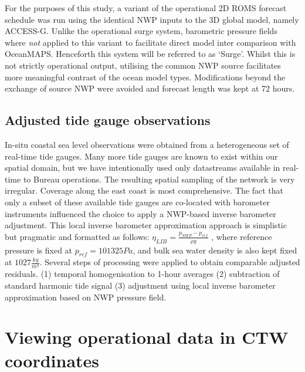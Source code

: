 For the purposes of this study, a variant of the operational 2D ROMS forecast schedule was run using the identical NWP inputs to the 3D global model, namely ACCESS-G.   
Unlike the operational surge system, barometric pressure fields where \emph{not} applied to this variant to facilitate direct model inter comparison with OceanMAPS.
Henceforth this system will be referred to as `Surge'.
Whilst this is not strictly operational output, utilising the common NWP source facilitates more meaningful contrast of the ocean model types. 
Modifications beyond the exchange of source NWP were avoided and forecast length was kept at 72 hours.


\subsection{Adjusted tide gauge observations}
In-situ coastal sea level observations were obtained from a heterogeneous set of real-time tide gauges. 
Many more tide gauges are known to exist within our spatial domain, but we have intentionally used only datastreams available in real-time to Bureau operations.
The resulting spatial sampling of the network is very irregular. 
Coverage along the east coast is most comprehensive.   
The fact that only a subset of these available tide gauges are co-located with barometer instruments influenced the choice to apply a NWP-based inverse barometer adjustment.
This local inverse barometer approximation approach is simplistic \citep{Mathers:2004bk} but pragmatic and formatted as follows:
$ \eta_{LIB} = \frac{ p_{NWP} - p_{ref} }{ \rho g } $
, where reference pressure is fixed at $p_{ref}=101325Pa$, and bulk sea water density is also kept fixed at $1027\frac{kg}{m^3}$. 
Several steps of processing were applied to obtain comparable adjusted residuals.
(1) temporal homogenisation to 1-hour averages (2) subtraction of standard harmonic tide signal (3) adjustment using local inverse barometer approximation based on NWP pressure field.

\section{Viewing operational data in CTW coordinates}


